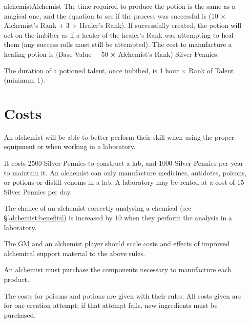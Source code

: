 \begin{Skill}[1.1]{alchemist}{Alchemist}
The time required to produce the potion is the same as a magical one,
and the equation to see if the process was successful is (10 ×
Alchemist’s Rank + 3 × Healer’s Rank).  If successfully created, the
potion will act on the imbiber as if a healer of the healer’s Rank was
attempting to heal them (any success rolls must still be attempted).
The cost to manufacture a healing potion is (Base Value − 50 ×
Alchemist’s Rank) Silver Pennies.

The duration of a potioned talent, once imbibed, is 1 hour × Rank of
Talent (minimum 1).

\section{Costs}
\label{alchemist:costs}
An alchemist will be able to better perform their skill when using the
proper equipment or when working in a laboratory.

It costs 2500 Silver Pennies to construct a lab, and 1000 Silver
Pennies per year to maintain it.  An alchemist can only manufacture
medicines, antidotes, poisons, or potions or distill venoms in a lab.
A laboratory may be rented at a cost of 15 Silver Pennies per day.

The chance of an alchemist correctly analysing a chemical (see
\S\ref{alchemist:benefits}) is increased by 10 when they perform the
analysis in a laboratory.

The GM and an alchemist player should scale costs and effects of
improved alchemical support material to the above rules.

An alchemist must purchase the components necessary to manufacture
each product.

The costs for poisons and potions are given with their rules.  All
costs given are for one creation attempt; if that attempt fails, new
ingredients must be purchased.

\end{Skill}
